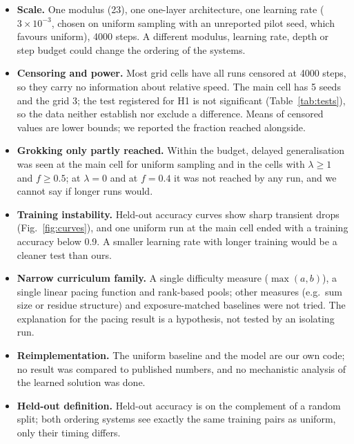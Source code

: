\begin{itemize}
\item \textbf{Scale.} One modulus (23), one one-layer architecture, one learning rate ($3\times10^{-3}$, chosen on uniform sampling with an unreported pilot seed, which favours uniform), 4000 steps. A different modulus, learning rate, depth or step budget could change the ordering of the systems.
\item \textbf{Censoring and power.} Most grid cells have all runs censored at 4000 steps, so they carry no information about relative speed. The main cell has 5 seeds and the grid 3; the test registered for H1 is not significant (Table~\ref{tab:tests}), so the data neither establish nor exclude a difference. Means of censored values are lower bounds; we reported the fraction reached alongside.
\item \textbf{Grokking only partly reached.} Within the budget, delayed generalisation was seen at the main cell for uniform sampling and in the cells with $\lambda\ge1$ and $f\ge0.5$; at $\lambda=0$ and at $f=0.4$ it was not reached by any run, and we cannot say if longer runs would.
\item \textbf{Training instability.} Held-out accuracy curves show sharp transient drops (Fig.~\ref{fig:curves}), and one uniform run at the main cell ended with a training accuracy below 0.9. A smaller learning rate with longer training would be a cleaner test than ours.
\item \textbf{Narrow curriculum family.} A single difficulty measure ($\max(a,b)$), a single linear pacing function and rank-based pools; other measures (e.g.\ sum size or residue structure) and exposure-matched baselines were not tried. The explanation for the pacing result is a hypothesis, not tested by an isolating run.
\item \textbf{Reimplementation.} The uniform baseline and the model are our own code; no result was compared to published numbers, and no mechanistic analysis of the learned solution was done.
\item \textbf{Held-out definition.} Held-out accuracy is on the complement of a random split; both ordering systems see exactly the same training pairs as uniform, only their timing differs.
\end{itemize}
